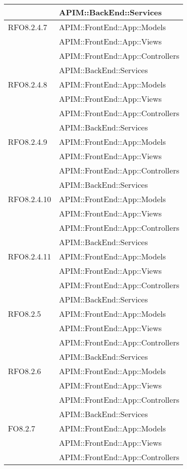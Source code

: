 \begin{longtable}{ p{4cm} | p{12cm} }
			& APIM::BackEnd::Services \\
			\hline		
			RFO8.2.4.7
			& APIM::FrontEnd::App::Models \\
			& APIM::FrontEnd::App::Views \\
			& APIM::FrontEnd::App::Controllers \\
			& APIM::BackEnd::Services \\
			\hline		
			RFO8.2.4.8
			& APIM::FrontEnd::App::Models \\
			& APIM::FrontEnd::App::Views \\
			& APIM::FrontEnd::App::Controllers \\
			& APIM::BackEnd::Services \\
			\hline	
			RFO8.2.4.9
			& APIM::FrontEnd::App::Models \\
			& APIM::FrontEnd::App::Views \\
			& APIM::FrontEnd::App::Controllers \\
			& APIM::BackEnd::Services \\
			\hline		
			RFO8.2.4.10
			& APIM::FrontEnd::App::Models \\
			& APIM::FrontEnd::App::Views \\
			& APIM::FrontEnd::App::Controllers \\
			& APIM::BackEnd::Services \\
			\hline		
			RFO8.2.4.11
			& APIM::FrontEnd::App::Models \\
			& APIM::FrontEnd::App::Views \\
			& APIM::FrontEnd::App::Controllers \\
			& APIM::BackEnd::Services \\
			\hline	
			RFO8.2.5
			& APIM::FrontEnd::App::Models \\
			& APIM::FrontEnd::App::Views \\
			& APIM::FrontEnd::App::Controllers \\
			& APIM::BackEnd::Services \\
			\hline	
			RFO8.2.6
			& APIM::FrontEnd::App::Models \\
			& APIM::FrontEnd::App::Views \\
			& APIM::FrontEnd::App::Controllers \\
			& APIM::BackEnd::Services \\
			\hline		
			FO8.2.7
			& APIM::FrontEnd::App::Models \\
			& APIM::FrontEnd::App::Views \\
			& APIM::FrontEnd::App::Controllers \\

\end{longtable}
